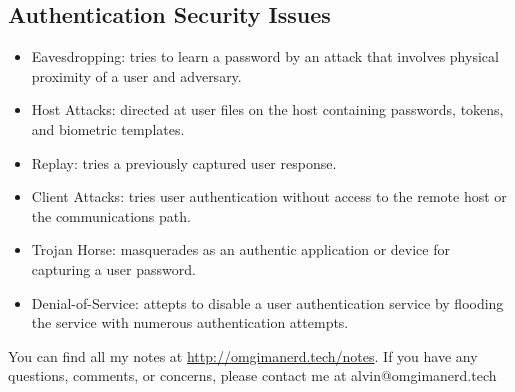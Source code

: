 \documentclass{math}
\begin{document}
\subsection*{Authentication Security Issues}
\begin{itemize}
  \item Eavesdropping: tries to learn a password by an attack that involves
  physical proximity of a user and adversary.
  \item Host Attacks: directed at user files on the host containing passwords,
  tokens, and biometric templates.
  \item Replay: tries a previously captured user response.
  \item Client Attacks: tries user authentication without access to the remote
  host or the communications path.
  \item Trojan Horse: masquerades as an authentic application or device for
  capturing a user password.
  \item Denial-of-Service: attepts to disable a user authentication service by
  flooding the service with numerous authentication attempts.
\end{itemize}

\begin{center}
  You can find all my notes at \url{http://omgimanerd.tech/notes}. If you have
  any questions, comments, or concerns, please contact me at
  alvin@omgimanerd.tech
\end{center}
\end{document}
